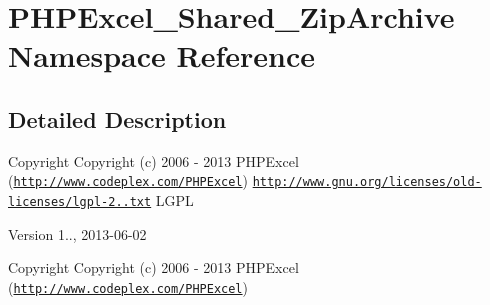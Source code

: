 \hypertarget{namespacePHPExcel__Shared__ZipArchive}{}\section{P\+H\+P\+Excel\+\_\+\+Shared\+\_\+\+Zip\+Archive Namespace Reference}
\label{namespacePHPExcel__Shared__ZipArchive}


\subsection{Detailed Description}
\begin{DoxyCopyright}{Copyright}
Copyright (c) 2006 -\/ 2013 P\+H\+P\+Excel (\href{http://www.codeplex.com/PHPExcel}{\tt http\+://www.\+codeplex.\+com/\+P\+H\+P\+Excel})  \href{http://www.gnu.org/licenses/old-licenses/lgpl-2.1.txt}{\tt http\+://www.\+gnu.\+org/licenses/old-\/licenses/lgpl-\/2..\+txt} L\+G\+PL 
\end{DoxyCopyright}
\begin{DoxyVersion}{Version}
1.., 2013-\/06-\/02
\end{DoxyVersion}
\begin{DoxyCopyright}{Copyright}
Copyright (c) 2006 -\/ 2013 P\+H\+P\+Excel (\href{http://www.codeplex.com/PHPExcel}{\tt http\+://www.\+codeplex.\+com/\+P\+H\+P\+Excel}) 
\end{DoxyCopyright}
